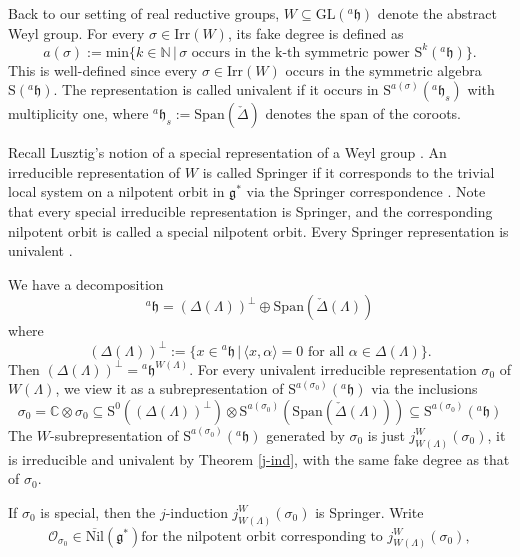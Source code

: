 \documentclass[12pt, a4paper]{amsart}
\numberwithin{equation}{section}
\newcommand{\BC}{{\mathbb {C}}}
\newcommand{\BN}{{\mathbb {N}}}
\newcommand{\CO}{{\mathcal {O}}}
\newcommand{\fg}{\mathfrak{g}}
\newcommand{\fh}{\mathfrak{h}}
\newcommand{\GL}{{\mathrm{GL}}}
\newcommand{\Irr}{{\mathrm{Irr}}}
\newcommand{\set}[2]{\{#1\,|\,#2\}}
\renewcommand{\bar}{\overline}
\begin{document}
Back to our setting of real reductive groups, $W \subseteq \GL({^{a}\fh})$ denote the abstract Weyl group. For every $\sigma \in \Irr(W)$, its fake degree is defined as 
\begin{equation}
    a(\sigma) := \mathrm{min}\set{k \in \BN}{\textrm{$\sigma$ occurs in the k-th symmetric power $\mathrm{S}^{k}({^{a}\fh})$}}.
\end{equation}
This is well-defined since every $\sigma \in \Irr(W)$ occurs in the symmetric algebra $\mathrm{S}(^{a}\fh)$. The representation is called univalent if it occurs in $\mathrm{S}^{a(\sigma)}(^{a}\fh_{s})$ with multiplicity one, where $^{a}\fh_{s}:= \mathrm{Span}(\check{\Delta})$ denotes the span of the coroots.

Recall Lusztig's notion of a special representation of a Weyl group \cite{Lus79}. An irreducible representation of $W$ is called Springer if it corresponds to the trivial local system on a nilpotent orbit in $\fg^*$ via the Springer correspondence  \cite{Spr}. Note that every special irreducible representation is Springer, and the corresponding nilpotent orbit is called a special nilpotent orbit. Every Springer representation is univalent \cite{BM}.

We have a decomposition
$$^{a}\fh = (\Delta(\Lambda))^{\perp} \oplus \mathrm{Span}(\check{\Delta}(\Lambda))$$
where
$$(\Delta(\Lambda))^{\perp} := \set{x \in {^{a}\fh}}{\textrm{$\langle x , \alpha \rangle = 0$ for all $\alpha \in \Delta(\Lambda)$}}.$$
Then $(\Delta(\Lambda))^{\perp} = {^{a}\fh}^{W(\Lambda)}$. For every univalent irreducible representation $\sigma_0$ of $W(\Lambda)$, we view it as a subrepresentation of $\mathrm{S}^{a(\sigma_0)}({^{a}\fh})$ via the inclusions
$$\sigma_0 = \BC \otimes \sigma_0 \subseteq \mathrm{S}^0((\Delta(\Lambda))^{\perp})\otimes \mathrm{S}^{a(\sigma_0)}(\mathrm{Span}(\check{\Delta}(\Lambda))) \subseteq \mathrm{S}^{a(\sigma_0)}({^{a}\fh})$$
The $W$-subrepresentation of $\mathrm{S}^{a(\sigma_0)}({^{a}\fh})$ generated by $\sigma_0$ is just $j_{W(\Lambda)}^{W}(\sigma_0)$, it is irreducible and univalent by Theorem \ref{j-ind}, with the same fake degree as that of $\sigma_0$.



If $\sigma_0$ is special, then the $j$-induction $j_{W(\Lambda)}^{W}(\sigma_0)$ is Springer. Write
\begin{equation}
    \CO_{\sigma_0} \in \bar{\mathrm{Nil}}(\fg^*) \textrm{for the nilpotent orbit corresponding to $j_{W(\Lambda)}^{W}(\sigma_0)$},
\end{equation}
\end{document}
